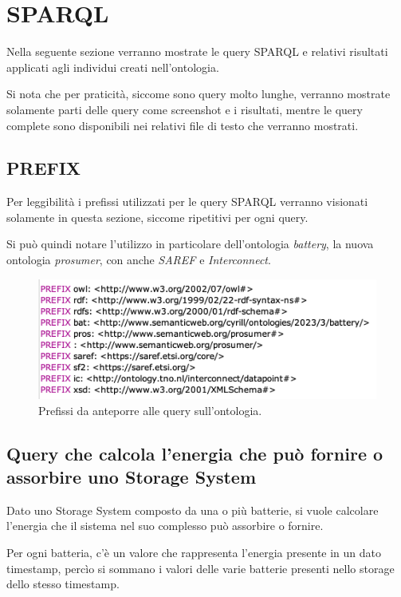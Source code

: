 \section{SPARQL}
Nella seguente sezione verranno mostrate le query SPARQL e relativi risultati applicati agli individui creati nell'ontologia.

Si nota che per praticità, siccome sono query molto lunghe, verranno mostrate solamente parti delle query come screenshot e i risultati, mentre le query complete sono disponibili nei relativi file di testo che verranno mostrati.


\subsection{PREFIX}
Per leggibilità i prefissi utilizzati per le query SPARQL verranno visionati solamente in questa sezione, siccome ripetitivi per ogni query.

Si può quindi notare l'utilizzo in particolare dell'ontologia \textit{battery}, la nuova ontologia \textit{prosumer}, con anche \textit{SAREF} e \textit{Interconnect}.

\begin{figure}[H]
    \centering
    \includegraphics[width=15cm]{images/prefissi.png}
    \caption{Prefissi da anteporre alle query sull'ontologia.}
    \label{fig:prefix}
\end{figure}

\subsection{Query che calcola l'energia che può fornire o assorbire uno Storage System} \label{subquery}

Dato uno Storage System composto da una o più batterie, si vuole calcolare l'energia che il sistema nel suo complesso può assorbire o fornire.

Per ogni batteria, c'è un valore che rappresenta l'energia presente in un dato timestamp, percìo si sommano i valori delle varie batterie presenti nello storage dello stesso timestamp.

